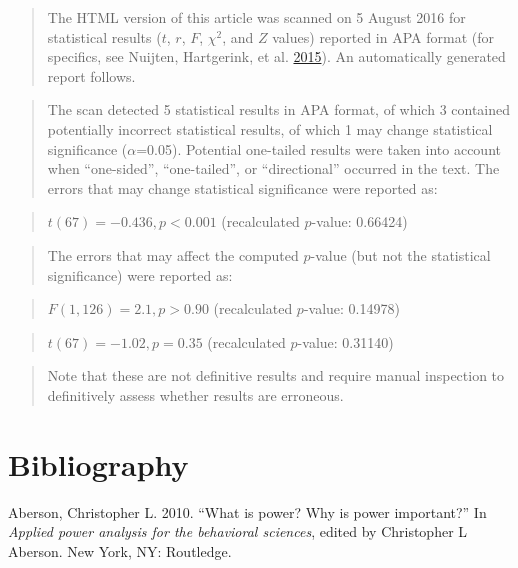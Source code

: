\documentclass[a5paper]{book}
\begin{document}
\begin{quote}
The HTML version of this article was scanned on 5 August 2016 for
statistical results (\(t\), \(r\), \(F\), \(\chi^2\), and \(Z\) values)
reported in APA format (for specifics, see Nuijten, Hartgerink, et al.
\protect\hyperlink{ref-doi:10.3758ux2fs13428-015-0664-2}{2015}). An
automatically generated report follows.
\end{quote}

\begin{quote}
The scan detected 5 statistical results in APA format, of which 3
contained potentially incorrect statistical results, of which 1 may
change statistical significance (\(\alpha\)=0.05). Potential one-tailed
results were taken into account when \enquote{one-sided},
\enquote{one-tailed}, or \enquote{directional} occurred in the text. The
errors that may change statistical significance were reported as:
\end{quote}

\begin{quote}
\(t(67)=-0.436, p<0.001\) (recalculated \(p\)-value: 0.66424)
\end{quote}

\begin{quote}
The errors that may affect the computed \(p\)-value (but not the
statistical significance) were reported as:
\end{quote}

\begin{quote}
\(F(1,126)=2.1, p>0.90\) (recalculated \(p\)-value: 0.14978)
\end{quote}

\begin{quote}
\(t(67)=-1.02, p=0.35\) (recalculated \(p\)-value: 0.31140)
\end{quote}

\begin{quote}
Note that these are not definitive results and require manual inspection
to definitively assess whether results are erroneous.
\end{quote}

\chapter*{Bibliography}\label{bibliography}

\hypertarget{refs}{}
\hypertarget{ref-Aberson2010-xa}{}
Aberson, Christopher L. 2010. ``What is power? Why is power important?''
In \emph{Applied power analysis for the behavioral sciences}, edited by
Christopher L Aberson. New York, NY: Routledge.
\end{document}

